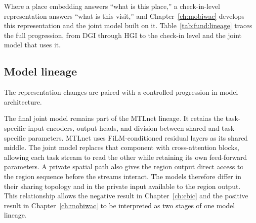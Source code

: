 Where a place embedding answers ``what is this place,'' a check-in-level representation
answers ``what is this visit,'' and
Chapter~\ref{ch:mobiwac} develops this representation and the joint model built on it.
Table~\ref{tab:fund:lineage} traces the full progression, from DGI through HGI to the
check-in level and the joint model that uses it.

\subsection{Model lineage}

The representation changes are paired with a controlled progression in model
architecture.

The final joint model remains part of the MTLnet lineage. It retains the task-specific
input encoders, output heads, and division between shared and task-specific parameters.
MTLnet uses FiLM-conditioned residual layers as its shared middle. The joint model
replaces that component with cross-attention blocks, allowing each task stream to
read the other while retaining its own feed-forward parameters. A private spatial
path also gives the region output direct access to the region sequence before the
streams interact. The models therefore differ in their sharing topology and in the
private input available to the region output. This relationship allows the negative
result in Chapter~\ref{ch:cbic} and the positive result in
Chapter~\ref{ch:mobiwac} to be interpreted as two stages of one model lineage.
